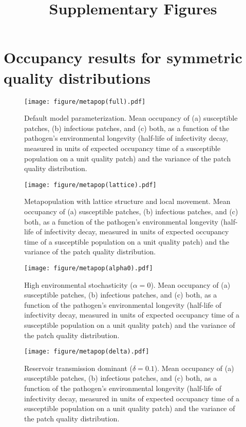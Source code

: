 \documentclass{article}
\title{Supplementary Figures}
\begin{document}
\maketitle

\section{Occupancy results for symmetric quality distributions}

\begin{figure}[h!]
\centering
\texttt{[image: figure/metapop(full).pdf]}
\caption{Default model parameterization.  Mean occupancy of (a) susceptible patches, (b) infectious patches, and (c) both, as a function of the pathogen's environmental longevity (half-life of infectivity decay, measured in units of expected occupancy time of a susceptible population on a unit quality patch) and the variance of the patch quality distribution.}
\label{poutcome}
\end{figure}   

\begin{figure}[h!]
\centering
\texttt{[image: figure/metapop(lattice).pdf]}
\caption{Metapopulation with lattice structure and local movement.  Mean occupancy of (a) susceptible patches, (b) infectious patches, and (c) both, as a function of the pathogen's environmental longevity (half-life of infectivity decay, measured in units of expected occupancy time of a susceptible population on a unit quality patch) and the variance of the patch quality distribution.}
\label{poutcome_lattice}
\end{figure}   

\begin{figure}[h!]
\centering
\texttt{[image: figure/metapop(alpha0).pdf]}
\caption{High environmental stochasticity ($\alpha = 0$).  Mean occupancy of (a) susceptible patches, (b) infectious patches, and (c) both, as a function of the pathogen's environmental longevity (half-life of infectivity decay, measured in units of expected occupancy time of a susceptible population on a unit quality patch) and the variance of the patch quality distribution.}
\label{poutcome_x0}
\end{figure}   

\begin{figure}[h!]
\centering
\texttt{[image: figure/metapop(delta).pdf]}
\caption{Reservoir transmission dominant ($\delta = 0.1$).  Mean occupancy of (a) susceptible patches, (b) infectious patches, and (c) both, as a function of the pathogen's environmental longevity (half-life of infectivity decay, measured in units of expected occupancy time of a susceptible population on a unit quality patch) and the variance of the patch quality distribution.}
\label{poutcome_delta}
\end{figure}   
\end{document}
